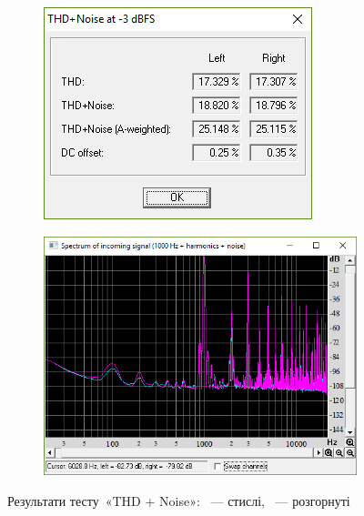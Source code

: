 \documentclass[
	a4paper,
	oneside,
	BCOR = 10mm,
	DIV = 12,
	12pt,
	headings = normal,
]{scrartcl}
\begin{document}
			\begin{figure}[!htbp]
				\centering
				\begin{subfigure}[t]{\columnwidth / 2}
					\centering
					\includegraphics[height=08\baselineskip]{./assets/y03s02-pcdiag-lab-07-p05-01-thd.png}
					\caption{}
					\label{subfig:sca-thd}
				\end{subfigure}%
				\begin{subfigure}[t]{\columnwidth / 2}
					\centering
					\includegraphics[height=08\baselineskip]{./assets/y03s02-pcdiag-lab-07-p05-02-thd-det.png}
					\caption{}
					\label{subfig:sca-thd-det}
				\end{subfigure}
				\caption{Результати тесту~«\textenglish{THD + Noise}»: ~— стислі, ~— розгорнуті}
				\label{fig:sca-thd}
			\end{figure}
	
\end{document}
